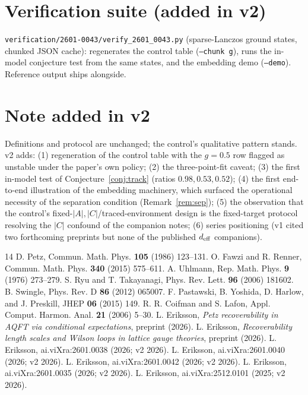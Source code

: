 \documentclass[11pt]{article}
\theoremstyle{remark}
\begin{document}
\section{Verification suite (added in v2)}
\texttt{verification/2601-0043/verify\_2601\_0043.py} (sparse-Lanczos
ground states, chunked JSON cache): regenerates the control table
(\texttt{--chunk g}), runs the in-model conjecture test from the same
states, and the embedding demo (\texttt{--demo}). Reference output ships
alongside.

\section*{Note added in v2}
Definitions and protocol are unchanged; the control's qualitative
pattern stands. v2 adds: (1) regeneration of the control table with the
$g = 0.5$ row flagged as unstable under the paper's own policy; (2) the
three-point-fit caveat; (3) the first in-model test of
Conjecture~\ref{conj:track} (ratios $0.98, 0.53, 0.52$); (4) the first
end-to-end illustration of the embedding machinery, which surfaced the
operational necessity of the separation condition
(Remark~\ref{rem:sep}); (5) the observation that the control's
fixed-$|A|,|C|$/traced-environment design is the fixed-target protocol
resolving the $|C|$ confound of the companion notes; (6) series
positioning (v1 cited two forthcoming preprints but none of the
published $d_{\rm eff}$ companions).

\begin{thebibliography}{14}
 D. Petz, Commun. Math. Phys. \textbf{105} (1986)
123--131.
 O. Fawzi and R. Renner, Commun. Math. Phys. \textbf{340}
(2015) 575--611.
 A. Uhlmann, Rep. Math. Phys. \textbf{9} (1976)
273--279.
 S. Ryu and T. Takayanagi, Phys. Rev. Lett. \textbf{96}
(2006) 181602.
 B. Swingle, Phys. Rev. D \textbf{86} (2012) 065007.
 F. Pastawski, B. Yoshida, D. Harlow, and J. Preskill,
JHEP \textbf{06} (2015) 149.
 R. R. Coifman and S. Lafon, Appl. Comput. Harmon.
Anal. \textbf{21} (2006) 5--30.
 L. Eriksson, \emph{Petz recoverability in AQFT via
conditional expectations}, preprint (2026).
 L. Eriksson, \emph{Recoverability length scales and
Wilson loops in lattice gauge theories}, preprint (2026).
 L. Eriksson, ai.viXra:2601.0038 (2026; v2 2026).
 L. Eriksson, ai.viXra:2601.0040 (2026; v2 2026).
 L. Eriksson, ai.viXra:2601.0042 (2026; v2 2026).
 L. Eriksson, ai.viXra:2601.0035 (2026; v2 2026).
 L. Eriksson, ai.viXra:2512.0101 (2025; v2 2026).
\end{thebibliography}
\end{document}
